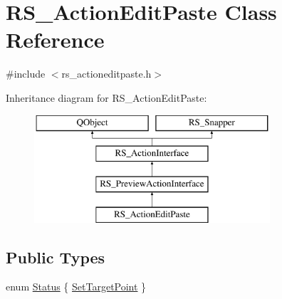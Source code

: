 \hypertarget{classRS__ActionEditPaste}{\section{R\-S\-\_\-\-Action\-Edit\-Paste Class Reference}
\label{classRS__ActionEditPaste}
}


{\ttfamily \#include $<$rs\-\_\-actioneditpaste.\-h$>$}

Inheritance diagram for R\-S\-\_\-\-Action\-Edit\-Paste\-:\begin{figure}[H]
\begin{center}
\leavevmode
\includegraphics[height=4.000000cm]{classRS__ActionEditPaste}
\end{center}
\end{figure}
\subsection*{Public Types}
\begin{DoxyCompactItemize}
\item 
enum \hyperlink{classRS__ActionEditPaste_a62a4fec76d478a15a268e05d776669a5}{Status} \{ \hyperlink{classRS__ActionEditPaste_a62a4fec76d478a15a268e05d776669a5aefbd837f53eb7762becc440909ca56cb}{Set\-Target\-Point}
 \}
\end{DoxyCompactItemize}
